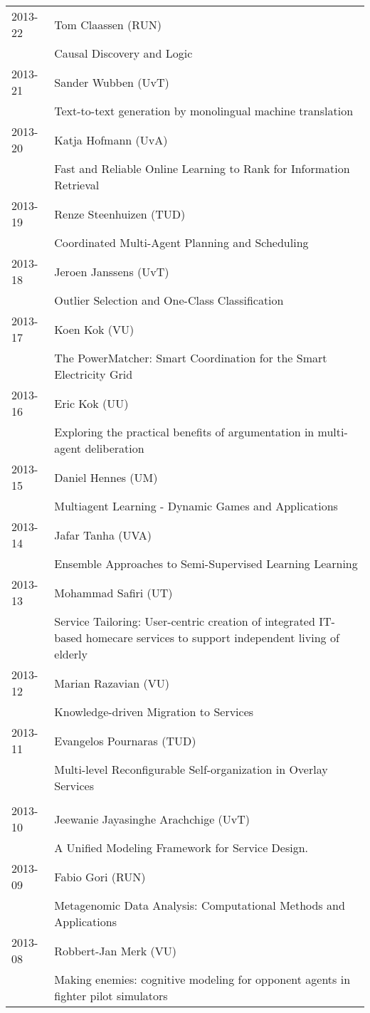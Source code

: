 \begin{longtable}{p{1.25cm}p{10.75cm}}
2013-22 & Tom Claassen (RUN) \\& Causal Discovery and Logic \\
2013-21 & Sander Wubben (UvT) \\& Text-to-text generation by monolingual machine translation \\
2013-20 & Katja Hofmann (UvA) \\& Fast and Reliable Online Learning to Rank for Information Retrieval \\
2013-19 & Renze Steenhuizen (TUD) \\& Coordinated Multi-Agent Planning and Scheduling \\
2013-18 & Jeroen Janssens (UvT) \\& Outlier Selection and One-Class Classification \\
2013-17 & Koen Kok (VU) \\& The PowerMatcher: Smart Coordination for the Smart Electricity Grid \\
2013-16 & Eric Kok (UU) \\& Exploring the practical benefits of argumentation in multi-agent \newline deliberation \\
2013-15 & Daniel Hennes (UM) \\& Multiagent Learning - Dynamic Games and Applications \\
2013-14 & Jafar Tanha (UVA) \\& Ensemble Approaches to Semi-Supervised Learning Learning \\
2013-13 & Mohammad Safiri (UT) \\& Service Tailoring: User-centric creation of integrated IT-based homecare services to support independent living of elderly \\
2013-12 & Marian Razavian (VU) \\& Knowledge-driven Migration to Services \\
2013-11 & Evangelos Pournaras (TUD) \\& Multi-level Reconfigurable Self-organization in Overlay Services \\
\\
2013-10 & Jeewanie Jayasinghe Arachchige (UvT) \\& A Unified Modeling Framework for Service Design. \\
2013-09 & Fabio Gori (RUN) \\& Metagenomic Data Analysis: Computational Methods and Applications \\
2013-08 & Robbert-Jan Merk (VU) \\& Making enemies: cognitive modeling for opponent agents in fighter pilot simulators \\

\end{longtable}
